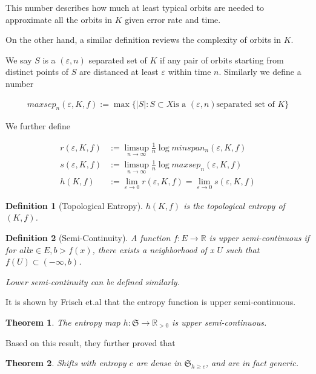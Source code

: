 \documentclass{article}
\newtheorem{definition}{Definition}
\newtheorem{theorem}{Theorem}
\begin{document}
\begin{CJK}{UTF8}{gbsn}
This number describes how much at least typical orbits are needed to approximate all the orbits in $K$ given error rate and time.

\vspace{3ex}

On the other hand, a similar definition reviews the complexity of orbits in $K$.

We say $S$ is a $(\varepsilon,n)$ separated set of $K$ if any pair of orbits starting from distinct points of $S$ are distanced at least $\varepsilon$ within time $n$. Similarly we define a number

\begin{align*}
	maxsep_n(\varepsilon,K,f):=\max\{|S|:S\subset X \mbox{is a } (\varepsilon,n) \mbox{separated set of } K\} 
\end{align*}

We further define 

\begin{align*}
	r(\varepsilon,K,f)&:=\limsup_{n\rightarrow\infty}\frac{1}{n}\log minspan_n(\varepsilon,K,f) \\
	s(\varepsilon,K,f)&:=\limsup_{n\rightarrow\infty}\frac{1}{n}\log maxsep_n(\varepsilon,K,f) \\
	h(K,f)&:=\lim_{\varepsilon\rightarrow0}r(\varepsilon,K,f)=\lim_{\varepsilon\rightarrow0}s(\varepsilon,K,f)
\end{align*}

\begin{definition}[Topological Entropy]
	$h(K,f)$ is the topological entropy of $(K,f)$.
\end{definition}


\begin{definition}[Semi-Continuity]
	A function $f:E\rightarrow \mathbb{R}$ is upper semi-continuous if for all$x \in E, b>f(x)$, there exists  a neighborhood of x $U$ such that $f(U)\subset (-\infty,b)$.
	
	Lower semi-continuity can be defined similarly.
\end{definition}

It is shown by Frisch\cite{Frisch} et.al that the entropy function is upper semi-continuous.

\begin{theorem}
	The entropy map $h:\mathfrak{S}\rightarrow \mathbb{R}_{>0}$ is upper semi-continuous.
\end{theorem}

Based on this result, they further proved that

\begin{theorem}
	Shifts with entropy $c$ are dense in $\mathfrak{S}_{h\geq c}$, and are in fact generic.
\end{theorem}


\end{CJK}
\end{document}
